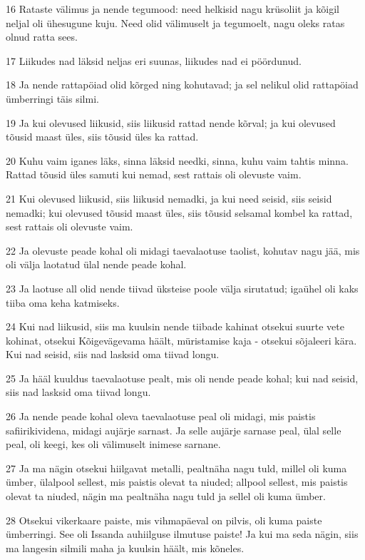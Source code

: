 \par 16 Rataste välimus ja nende tegumood: need helkisid nagu krüsoliit ja kõigil neljal oli ühesugune kuju. Need olid välimuselt ja tegumoelt, nagu oleks ratas olnud ratta sees.
\par 17 Liikudes nad läksid neljas eri suunas, liikudes nad ei pöördunud.
\par 18 Ja nende rattapöiad olid kõrged ning kohutavad; ja sel nelikul olid rattapöiad ümberringi täis silmi.
\par 19 Ja kui olevused liikusid, siis liikusid rattad nende kõrval; ja kui olevused tõusid maast üles, siis tõusid üles ka rattad.
\par 20 Kuhu vaim iganes läks, sinna läksid needki, sinna, kuhu vaim tahtis minna. Rattad tõusid üles samuti kui nemad, sest rattais oli olevuste vaim.
\par 21 Kui olevused liikusid, siis liikusid nemadki, ja kui need seisid, siis seisid nemadki; kui olevused tõusid maast üles, siis tõusid selsamal kombel ka rattad, sest rattais oli olevuste vaim.
\par 22 Ja olevuste peade kohal oli midagi taevalaotuse taolist, kohutav nagu jää, mis oli välja laotatud ülal nende peade kohal.
\par 23 Ja laotuse all olid nende tiivad üksteise poole välja sirutatud; igaühel oli kaks tiiba oma keha katmiseks.
\par 24 Kui nad liikusid, siis ma kuulsin nende tiibade kahinat otsekui suurte vete kohinat, otsekui Kõigevägevama häält, müristamise kaja - otsekui sõjaleeri kära. Kui nad seisid, siis nad lasksid oma tiivad longu.
\par 25 Ja hääl kuuldus taevalaotuse pealt, mis oli nende peade kohal; kui nad seisid, siis nad lasksid oma tiivad longu.
\par 26 Ja nende peade kohal oleva taevalaotuse peal oli midagi, mis paistis safiirikividena, midagi aujärje sarnast. Ja selle aujärje sarnase peal, ülal selle peal, oli keegi, kes oli välimuselt inimese sarnane.
\par 27 Ja ma nägin otsekui hiilgavat metalli, pealtnäha nagu tuld, millel oli kuma ümber, ülalpool sellest, mis paistis olevat ta niuded; allpool sellest, mis paistis olevat ta niuded, nägin ma pealtnäha nagu tuld ja sellel oli kuma ümber.
\par 28 Otsekui vikerkaare paiste, mis vihmapäeval on pilvis, oli kuma paiste ümberringi. See oli Issanda auhiilguse ilmutuse paiste! Ja kui ma seda nägin, siis ma langesin silmili maha ja kuulsin häält, mis kõneles.

